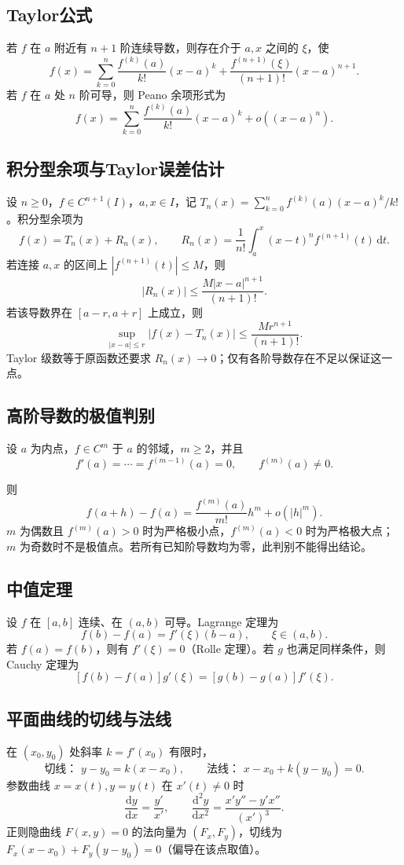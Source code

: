 \documentclass[../main.tex]{subfiles}
\begin{document}
\subsection{Taylor公式}
若 $f$ 在 $a$ 附近有 $n+1$ 阶连续导数，则存在介于 $a,x$ 之间的 $\xi$，使
\[
f(x)=\sum_{k=0}^n\frac{f^{(k)}(a)}{k!}(x-a)^k+
\frac{f^{(n+1)}(\xi)}{(n+1)!}(x-a)^{n+1}.
\]
若 $f$ 在 $a$ 处 $n$ 阶可导，则 Peano 余项形式为
\[
f(x)=\sum_{k=0}^n\frac{f^{(k)}(a)}{k!}(x-a)^k+o((x-a)^n).
\]
\subsection{积分型余项与Taylor误差估计}
设 $n\ge0$，$f\in C^{n+1}(I)$，$a,x\in I$，记
$T_n(x)=\sum_{k=0}^nf^{(k)}(a)(x-a)^k/k!$。积分型余项为
\[
f(x)=T_n(x)+R_n(x),\qquad
R_n(x)=\frac1{n!}\int_a^x(x-t)^nf^{(n+1)}(t)\,\mathrm dt.
\]
若连接 $a,x$ 的区间上 $|f^{(n+1)}(t)|\le M$，则
\[
|R_n(x)|\le\frac{M|x-a|^{n+1}}{(n+1)!}.
\]
若该导数界在 $[a-r,a+r]$ 上成立，则
\[
\sup_{|x-a|\le r}|f(x)-T_n(x)|\le\frac{Mr^{n+1}}{(n+1)!}.
\]
Taylor 级数等于原函数还要求 $R_n(x)\to0$；仅有各阶导数存在不足以保证这一点。
\subsection{高阶导数的极值判别}
设 $a$ 为内点，$f\in C^m$ 于 $a$ 的邻域，$m\ge2$，并且
\[
f'(a)=\cdots=f^{(m-1)}(a)=0,\qquad f^{(m)}(a)\ne0.
\]
\par\pagebreak[0]\begin{samepage}
则
\[
f(a+h)-f(a)=\frac{f^{(m)}(a)}{m!}h^m+o(|h|^m).
\]
$m$ 为偶数且 $f^{(m)}(a)>0$ 时为严格极小点，$f^{(m)}(a)<0$ 时为严格极大点；$m$ 为奇数时不是极值点。若所有已知阶导数均为零，此判别不能得出结论。
\par\end{samepage}\pagebreak[0]
\subsection{中值定理}
设 $f$ 在 $[a,b]$ 连续、在 $(a,b)$ 可导。Lagrange 定理为
\[
f(b)-f(a)=f'(\xi)(b-a),\qquad \xi\in(a,b).
\]
若 $f(a)=f(b)$，则有 $f'(\xi)=0$（Rolle 定理）。若 $g$ 也满足同样条件，则 Cauchy 定理为
\[
[f(b)-f(a)]g'(\xi)=[g(b)-g(a)]f'(\xi).
\]
\subsection{平面曲线的切线与法线}
在 $(x_0,y_0)$ 处斜率 $k=f'(x_0)$ 有限时，
\[
\text{切线： }y-y_0=k(x-x_0),\qquad
\text{法线： }x-x_0+k(y-y_0)=0.
\]
参数曲线 $x=x(t),y=y(t)$ 在 $x'(t)\ne0$ 时
\[
\frac{\mathrm dy}{\mathrm dx}=\frac{y'}{x'},\qquad
\frac{\mathrm d^2y}{\mathrm dx^2}=\frac{x'y''-y'x''}{(x')^3}.
\]
正则隐曲线 $F(x,y)=0$ 的法向量为 $(F_x,F_y)$，切线为 $F_x(x-x_0)+F_y(y-y_0)=0$（偏导在该点取值）。
\end{document}
